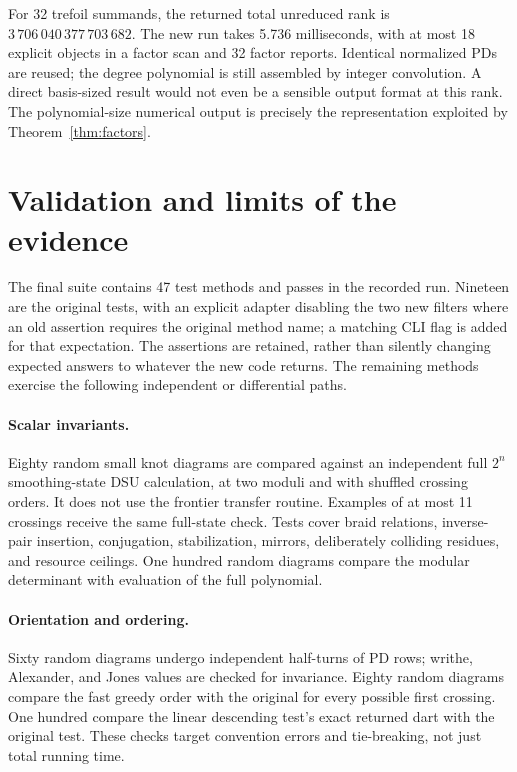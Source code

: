 \documentclass[11pt,letterpaper]{article}
\theoremstyle{definition}
\begin{document}
For 32 trefoil summands, the returned total unreduced rank is
$3\,706\,040\,377\,703\,682$. The new run takes 5.736 milliseconds, with at most
18 explicit objects in a factor scan and 32 factor reports. Identical normalized
PDs are reused; the degree polynomial is still assembled by integer
convolution. A direct basis-sized result would not even be a sensible output
format at this rank. The polynomial-size numerical output is precisely the
representation exploited by Theorem~\ref{thm:factors}.
\FloatBarrier

\section[Validation]{Validation and limits of the evidence}

The final suite contains 47 test methods and passes in the recorded run.
Nineteen are the original tests, with an explicit adapter disabling the two new
filters where an old assertion requires the original method name; a matching
CLI flag is added for that expectation. The assertions are retained, rather
than silently changing expected answers to whatever the new code returns.
The remaining methods exercise the following independent or differential paths.

\paragraph{Scalar invariants.}
Eighty random small knot diagrams are compared against an independent full
$2^n$ smoothing-state DSU calculation, at two moduli and with shuffled crossing
orders. It does not use the frontier transfer routine. Examples of at most
11 crossings receive the same full-state check. Tests cover braid relations,
inverse-pair insertion, conjugation, stabilization, mirrors, deliberately
colliding residues, and resource ceilings. One hundred random diagrams compare
the modular determinant with evaluation of the full polynomial.

\paragraph{Orientation and ordering.}
Sixty random diagrams undergo independent half-turns of PD rows; writhe,
Alexander, and Jones values are checked for invariance. Eighty random diagrams
compare the fast greedy order with the original for every possible first
crossing. One hundred compare the linear descending test's exact returned dart
with the original test. These checks target convention errors and tie-breaking,
not just total running time.
\end{document}
